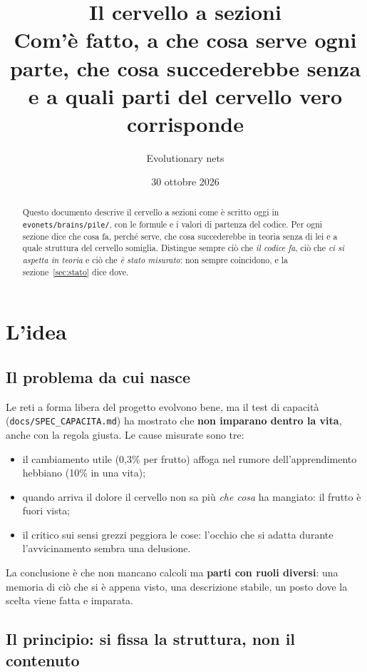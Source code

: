 \documentclass[11pt,a4paper]{article}
\title{\textbf{Il cervello a sezioni}\\[2mm]
\large Com'è fatto, a che cosa serve ogni parte, che cosa succederebbe senza\\
e a quali parti del cervello vero corrisponde}
\author{Evolutionary nets}
\date{30 ottobre 2026}
\begin{document}
\maketitle

\begin{abstract}
\noindent Questo documento descrive il cervello a sezioni come è scritto oggi in
\texttt{evonets/brains/pile/}, con le formule e i valori di partenza del codice.
Per ogni sezione dice che cosa fa, perché serve, che cosa succederebbe in teoria
senza di lei e a quale struttura del cervello somiglia. Distingue sempre ciò che
\emph{il codice fa}, ciò che \emph{ci si aspetta in teoria} e ciò che \emph{è stato
misurato}: non sempre coincidono, e la sezione~\ref{sec:stato} dice dove.
\end{abstract}

\tableofcontents
\newpage

\section{L'idea}

\subsection{Il problema da cui nasce}

Le reti a forma libera del progetto evolvono bene, ma il test di capacità
(\texttt{docs/SPEC\_CAPACITA.md}) ha mostrato che \textbf{non imparano dentro la
vita}, anche con la regola giusta. Le cause misurate sono tre:
\begin{itemize}
\item il cambiamento utile (0,3\% per frutto) affoga nel rumore dell'apprendimento
  hebbiano (10\% in una vita);
\item quando arriva il dolore il cervello non sa più \emph{che cosa} ha mangiato: il
  frutto è fuori vista;
\item il critico sui sensi grezzi peggiora le cose: l'occhio che si adatta durante
  l'avvicinamento sembra una delusione.
\end{itemize}
La conclusione è che non mancano calcoli ma \textbf{parti con ruoli diversi}: una
memoria di ciò che si è appena visto, una descrizione stabile, un posto dove la
scelta viene fatta e imparata.

\subsection{Il principio: si fissa la struttura, non il contenuto}
\end{document}
